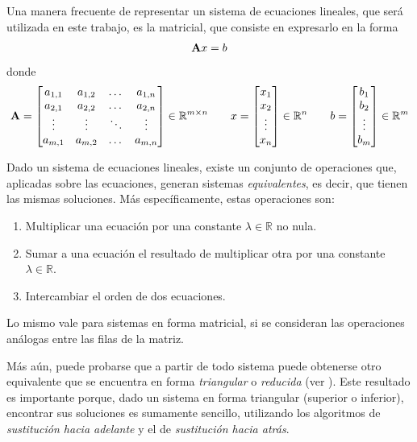         Una manera frecuente de representar un sistema de ecuaciones lineales, que será utilizada en este trabajo, es la matricial, que consiste en expresarlo en la forma
        \[ \mathbf{A}x = b \]
        donde
        \[ \mathbf{A} = \left[ \begin{matrix} a_{1,1} & a_{1,2} & \dots  & a_{1,n} \\
                                           a_{2,1} & a_{2,2} & \dots  & a_{2,n} \\
                                           \vdots  & \vdots  & \ddots & \vdots  \\
                                           a_{m,1} & a_{m,2} & \dots  & a_{m,n} \\ \end{matrix} \right] \in \mathbb{R}^{m \times n} \qquad
        x = \left[ \begin{matrix} x_1 \\ x_2 \\ \vdots \\ x_n \end{matrix} \right] \in \mathbb{R}^n \qquad
        b = \left[ \begin{matrix} b_1 \\ b_2 \\ \vdots \\ b_m \end{matrix} \right] \in \mathbb{R}^m \]

        Dado un sistema de ecuaciones lineales, existe un conjunto de operaciones que, aplicadas sobre las ecuaciones, generan sistemas \emph{equivalentes}, es decir, que tienen las mismas soluciones. Más específicamente, estas operaciones son:
        \begin{enumerate}[label=(\alph*), nosep]
            \item Multiplicar una ecuación por una constante $\lambda \in \mathbb{R}$ no nula.
            \item Sumar a una ecuación el resultado de multiplicar otra por una constante $\lambda \in \mathbb{R}$.
            \item Intercambiar el orden de dos ecuaciones.
        \end{enumerate}

        Lo mismo vale para sistemas en forma matricial, si se consideran las operaciones análogas entre las filas de la matriz.

        Más aún, puede probarse que a partir de todo sistema puede obtenerse otro equivalente que se encuentra en forma \emph{triangular} o \emph{reducida} (ver \cite[p.~358]{burden}). Este resultado es importante porque, dado un sistema en forma triangular (superior o inferior), encontrar sus soluciones es sumamente sencillo, utilizando los algoritmos de \emph{sustitución hacia adelante} y el de \emph{sustitución hacia atrás}.

